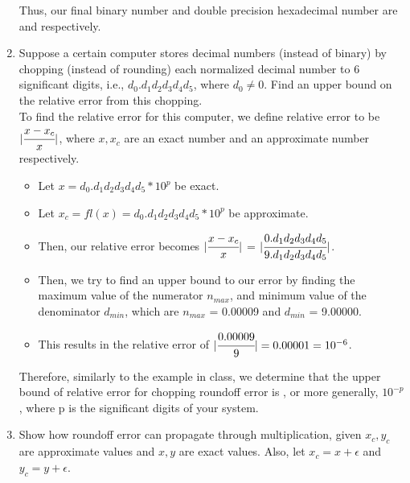 \documentclass[12pt]{article}
\begin{document}
\begin{enumerate}
\begin{itemize}
	\end{itemize}

Thus, our final binary number and double precision hexadecimal number are  and  respectively.\\

	\item Suppose a certain computer stores decimal numbers (instead of binary) by chopping (instead of rounding) each normalized decimal number to 6 significant digits, i.e., $d_0.d_1d_2d_3d_4d_5$, where $d_0 \neq 0$. Find an upper bound on the relative error from this chopping. \\ 
	
	To find the relative error for this computer, we define relative error to be $|\cfrac{x -x_c}{x}|$, where $x, x_c$ are an exact number and an approximate number respectively.	
		\begin{itemize}
			\item[] Let $x = d_0.d_1d_2d_3d_4d_5 * 10^p$ be exact.
			\item[] Let $x_c = fl(x) = d_0.d_1d_2d_3d_4d_5 * 10^p$ be approximate.
			\item[] Then, our relative error becomes $|\cfrac{x-x_c}{x}|$ = $|\cfrac{0.d_1d_2d_3d_4d_5}{9.d_1d_2d_3d_4d_5}|$.
			\item[] Then, we try to find an upper bound to our error by finding the maximum value of the numerator $n_{max}$, and minimum value of the denominator $d_{min}$, which are $n_{max}$ = 0.00009 and $d_{min}$ = 9.00000.
			\item[] This results in the relative error of  $|\cfrac{0.00009}{9}| = 0.00001 = 10^{-6}$.
		\end{itemize}
		Therefore, similarly to the example in class, we determine that the upper bound of relative error for chopping roundoff error is , or more generally, $10^{-p}$, where p is the significant digits of your system.\\
		
		\item Show how roundoff error can propagate through multiplication, given $x_c, y_c$ are approximate values and $x,y$ are exact values. Also, let $x_c = x + \epsilon$ and $y_c = y + \epsilon$. \\
	

\end{enumerate}
\end{document}
